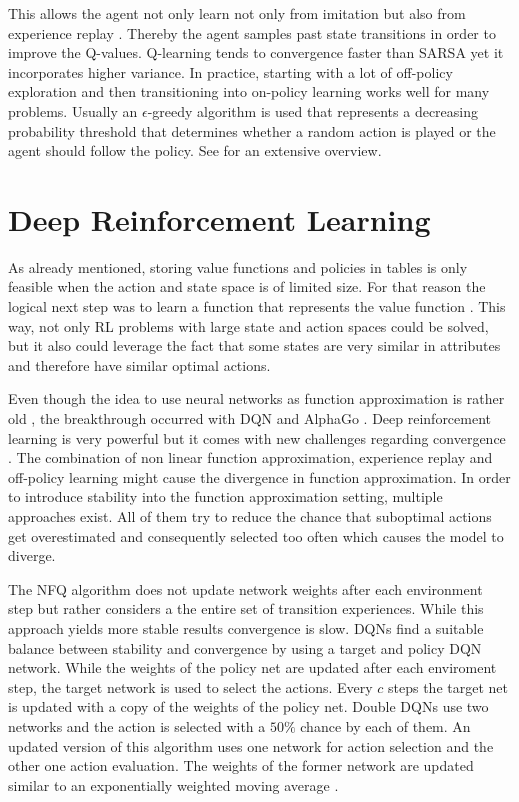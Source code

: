 \documentclass[10pt]{reportMaster}
\begin{document}
This allows the agent not only learn not only from imitation but also from experience replay \cite{lin1992self}. Thereby the agent samples past state transitions in order to improve the Q-values. Q-learning tends to convergence faster than \ac{SARSA} yet it incorporates higher variance. In practice, starting with a lot of off-policy exploration and then transitioning into on-policy learning works well for many problems. Usually an $\epsilon$-greedy algorithm is used that represents a decreasing probability threshold that determines whether a random action is played or the agent should follow the policy. See \cite{sutton2018reinforcement} for an extensive overview. 

\newpage
\section{Deep Reinforcement Learning} \label{Deep Reinforcement Learning}

As already mentioned, storing value functions and policies in tables is only feasible when the action and state space is of limited size. For that reason the logical next step was to learn a function that represents the value function \cite{sutton1999policy}. This way, not only \ac{RL} problems with large state and action spaces could be solved, but it also could leverage the fact that some states are very similar in attributes and therefore have similar optimal actions. 

Even though the idea to use neural networks as function approximation is rather old \cite{bertsekas1996neuro}, the breakthrough occurred with \ac{DQN} \cite{mnih2013playing} and AlphaGo \cite{silver2016mastering}. Deep reinforcement learning is very powerful but it comes with new challenges regarding convergence \cite{tsitsiklis1996analysis}. The combination of non linear function approximation, experience replay and off-policy learning might cause the divergence in function approximation. In order to introduce stability into the function approximation setting, multiple approaches exist. All of them try to reduce the chance that suboptimal actions get overestimated and consequently selected too often which causes the model to diverge. 

The \ac{NFQ} algorithm \cite{riedmiller2005neural} does not update network weights after each environment step but rather considers a the entire set of transition experiences. While this approach yields more stable results convergence is slow. 
\ac{DQN}s find a suitable balance between stability and convergence by using a target and policy \ac{DQN} network. While the weights of the policy net are updated after each enviroment step, the target network is used to select the actions. Every $c$ steps the target net is updated with a copy of the weights of the policy net. Double \ac{DQN}s \cite{hasselt2010double} use two networks and the action is selected with a $50\%$ chance by each of them. An updated version of this algorithm uses one network for action selection and the other one action evaluation. The weights of the former network are updated similar to an exponentially weighted moving average \cite{van2016deep}. 
\end{document}
